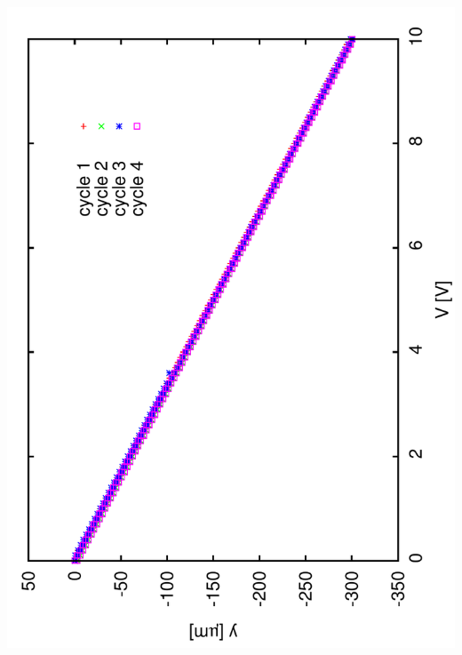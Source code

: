 \documentclass[a4paper,11pt]{book}
\begin{document}
\includegraphics[angle=-90,scale=0.15]{image02.pdf}
\end{document}
